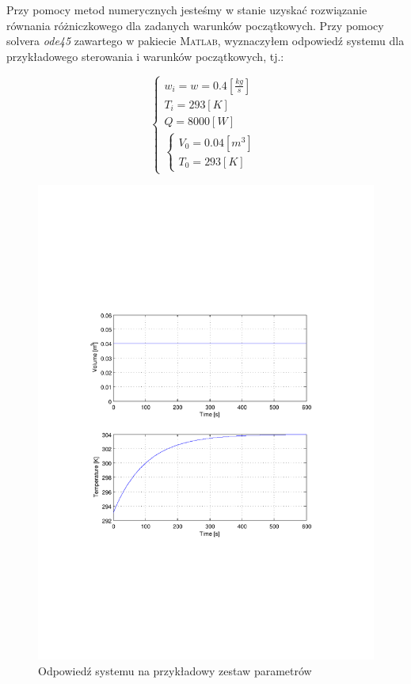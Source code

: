 \documentclass[12pt]{article}
\begin{document}
Przy pomocy metod numerycznych jesteśmy w stanie uzyskać rozwiązanie
równania różniczkowego dla zadanych warunków początkowych. Przy pomocy solvera
\textit{ode45} zawartego w pakiecie \textsc{Matlab}, wyznaczyłem odpowiedź
systemu dla przykładowego sterowania i warunków początkowych, tj.:

\begin{equation*}
	\begin{cases}
		w_i = w = 0.4 [\frac{kg}{s}]\\
		T_i = 293[K]\\
		Q=8000[W]\\[0.2cm]
		\begin{cases}
			V_0=0.04[m^3]\\
			T_0=293[K]
		\end{cases}
	\end{cases}
\end{equation*}

\newpage

\begin{figure}[!htb]
	\begin{center}
		\includegraphics[width=14cm,trim=3cm 7cm 3cm 8cm,clip]
		{../res/img/nonl_u0_x0.pdf}
	\end{center}
	\caption{Odpowiedź systemu na przykładowy zestaw parametrów}
\end{figure}
\end{document}
